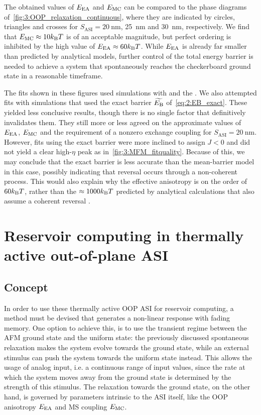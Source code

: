 The obtained values of $E_\mathrm{EA}$ and $E_\mathrm{MC}$ can be compared to the phase diagrams of~\cref{fig:3:OOP_relaxation_continuous}, where they are indicated by circles, triangles and crosses for $S_\mathrm{ASI} = \SI{20}{\nano\metre}$, \SI{25}{\nano\metre} and \SI{30}{\nano\metre}, respectively.
We find that $\EMC \approx 10 \kBT$ is of an acceptable magnitude, but perfect ordering is inhibited by the high value of $\EEA \approx 60 \kBT$.
While $E_\mathrm{EA}$ is already far smaller than predicted by analytical models, further control of the total energy barrier is needed to achieve a system that spontaneously reaches the checkerboard ground state in a reasonable timeframe. \\\par

The fits shown in these figures used \hotspice simulations with  and the .
We also attempted fits with simulations that used the exact barrier $\widetilde{E_\mathrm{B}}$ of~\cref{eq:2:EB_exact}.
These yielded less conclusive results, though there is no single factor that definitively invalidates them.
They still more or less agreed on the approximate values of $E_\mathrm{EA}$, $E_\mathrm{MC}$ and the requirement of a nonzero exchange coupling for $S_\mathrm{ASI} = \SI{20}{\nano\metre}$.
However, fits using the exact barrier were more inclined to assign $J < 0$ and did not yield a clear high-$\eta$ peak as in~\cref{fig:3:MFM_fitquality}.
Because of this, we may conclude that the exact barrier is less accurate than the mean-barrier model in this case, possibly indicating that reversal occurs through a non-coherent process.
This would also explain why the effective anisotropy is on the order of $60 \kBT$, rather than the $\approx 1000 \kBT$ predicted by analytical calculations that also assume a coherent reversal \cite[Supp.4]{KUR-24}.

\newpage
\section{Reservoir computing in thermally active out-of-plane ASI}
\subsection{Concept}
In order to use these thermally active OOP ASI for reservoir computing, a method must be devised that generates a non-linear response with fading memory.
One option to achieve this, is to use the transient regime between the AFM ground state and the uniform state: the previously discussed spontaneous relaxation makes the system evolve towards the ground state, while an external stimulus can push the system towards the uniform state instead.
This allows the usage of analog input, i.e. a continuous range of input values, since the rate at which the system moves away from the ground state is determined by the strength of this stimulus.
The relaxation towards the ground state, on the other hand, is governed by parameters intrinsic to the ASI itself, like the OOP anisotropy $E_\mathrm{EA}$ and MS coupling $E_\mathrm{MC}$.

